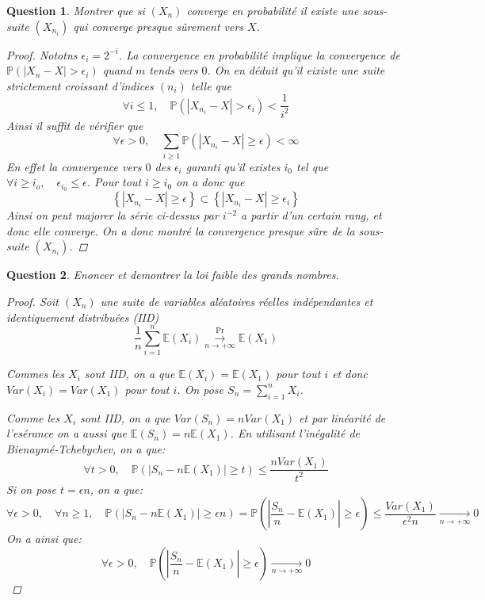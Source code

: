 \documentclass{article}
\theoremstyle{plain}
\newtheorem{question}{Question}
\theoremstyle{definition}
\begin{document}
\begin{question}
	Montrer que si $(X_n)$ converge en probabilité il existe une sous-suite $(X_{n_i})$ qui converge presque sûrement vers $X$.
	\begin{proof}
		Nototns $\epsilon_i = 2^{-i}$. La convergence en probabilité implique la convergence de $\mathbb{P} (|X_n - X| > \epsilon_i)$ quand $m$ tends vers $0$.
		On en déduit qu'il eixiste une suite strictement croissant d'indices $(n_i)$ telle que
		$$\forall i \leq 1, \quad \mathbb{P} (|X_{n_i} - X| > \epsilon_i) < \frac{1}{i^2}$$
		Ainsi il suffit de vérifier que
		$$\forall \epsilon > 0, \quad \sum_{i \geq 1} \mathbb{P} (|X_{n_i} - X| \geq \epsilon) < \infty$$
		En effet la convergence vers $0$ des $\epsilon_i$ garanti qu'il existes $i_0$ tel que $\forall i \geq i_o, \quad
			\epsilon_{i_0} \leq \epsilon$. Pour tout $i \geq i_0$ on a donc que
		$$ \left\{|X_{n_i} - X| \geq \epsilon \right\} \subset \left\{|X_{n_i} - X| \geq \epsilon_{i} \right\}$$
		Ainsi on peut majorer la série ci-dessus par $i^{-2}$ a partir d'un certain rang, et donc elle converge.
		On a donc montré la convergence presque sûre de la sous-suite $(X_{n_i})$.
	\end{proof}
\end{question}


\begin{question}
	Enoncer et demontrer la loi faible des grands nombres.
	\begin{proof}
		Soit $(X_n)$ une suite de variables aléatoires réelles indépendantes et identiquement distribuées (IID)
		\begin{equation}
			\frac{1}{n}\sum_{i=1}^n \mathbb{E} (X_i) \overset{\Pr}{\underset{n\to +\infty}{\longrightarrow}} \mathbb{E} (X_1)
		\end{equation}

		Commes les $X_i$ sont IID, on a que $\mathbb{E} (X_i) = \mathbb{E} (X_1)$ pour tout $i$ et donc
		$Var(X_i) = Var(X_1)$ pour tout $i$. On pose $S_n = \sum_{i=1}^n X_i$.

		Comme les $X_i$ sont IID, on a que $Var(S_n) = nVar(X_1)$ et par linéarité de l'esérance on a aussi que
		$\mathbb{E} (S_n) = n\mathbb{E} (X_1)$. En utilisant l'inégalité de Bienaymé-Tchebychev, on a que:
		\begin{equation*}
			\forall t > 0, \quad \mathbb{P} (|S_n - n\mathbb{E} (X_1)| \geq t) \leq \frac{nVar(X_1)}{t^2}
		\end{equation*}
		Si on pose $t = \epsilon n$, on a que:
		\begin{equation*}
			\forall \epsilon > 0, \quad \forall n \geq 1, \quad \mathbb{P} \left(|S_n - n\mathbb{E} (X_1)| \geq \epsilon n\right) =
			\mathbb{P} \left(|\frac{S_n}{n} - \mathbb{E} (X_1)| \geq \epsilon\right) \leq \frac{Var(X_1)}{\epsilon^2 n} \underset{n\to +\infty}{\longrightarrow} 0
		\end{equation*}
		On a ainsi que:
		$$ \forall \epsilon > 0,\quad \mathbb{P} \left(|\frac{S_n}{n} - \mathbb{E} (X_1)| \geq \epsilon\right) \underset{n\to +\infty}{\longrightarrow} 0$$
	\end{proof}
\end{question}
\end{document}
